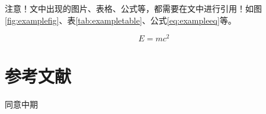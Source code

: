 \documentclass{CUCMidterm}
\begin{document}
{    注意！文中出现的图片、表格、公式等，都需要在文中进行引用！如图\ref{fig:examplefig}、表\ref{tab:exampletable}、公式\ref{eq:exampleeq}等。
  
    \begin{equation}
      E = mc^2 
      \label{eq:exampleeq}
    \end{equation}
  
    \section{参考文献}
    \printbibliography[heading=none]

}
{

}
{
    同意中期
}
\end{document}
